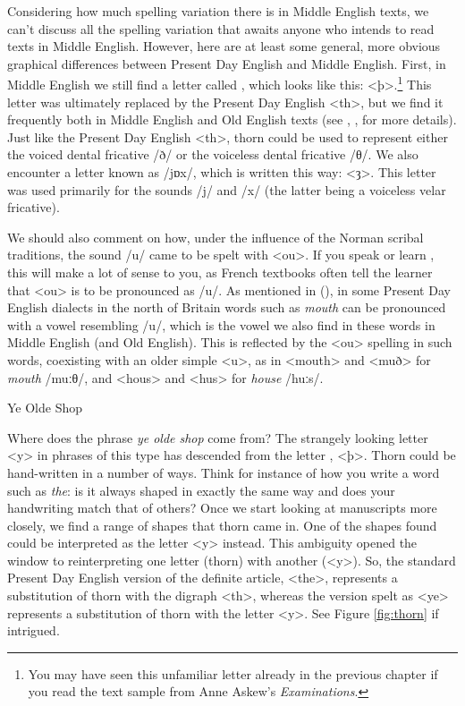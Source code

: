 \noindent Considering how much spelling variation there is in Middle English texts, we can't discuss all the spelling variation that awaits anyone who intends to read texts in Middle English. However, here are at least some general, more obvious graphical differences between Present Day English and Middle English. First, in Middle English we still find a letter called , which looks like this: <þ>.\footnote{You may have seen this unfamiliar letter already in the previous chapter if you read the text sample from Anne Askew's \textit{Examinations}.} This letter was ultimately replaced by the Present Day English <th>, but we find it frequently both in Middle English and Old English texts (see , , for more details). Just like the Present Day English <th>, thorn could be used to represent either the voiced dental fricative /ð/ or the voiceless dental fricative /θ/. We also encounter a letter known as  /jɒx/, which is written this way: <ȝ>. This letter was used primarily for the sounds /j/ and /x/ (the latter being a voiceless velar fricative).

We should also comment on how, under the influence of the Norman scribal traditions, the sound /u/ came to be spelt with <ou>. If you speak or learn , this will make a lot of sense to you, as French textbooks often tell the learner that <ou> is to be pronounced as /u/. As mentioned in  (), in some Present Day English dialects in the north of Britain words such as \textit{mouth} can be pronounced with a vowel resembling /u/, which is the vowel we also find in these words in Middle English (and Old English). This is reflected by the <ou> spelling in such words, coexisting with an older simple <u>, as in <mouth> and <muð> for \textit{mouth} /muːθ/, and <hous> and <hus> for \textit{house} /huːs/.


\begin{sourcebox}{Ye Olde Shop}

Where does the phrase \textit{ye olde shop} come from? The strangely looking letter <y> in phrases of this type has descended from the letter , <þ>. Thorn could be hand-written in a number of ways. Think for instance of how you write a word such as \textit{the}: is it always shaped in exactly the same way and does your handwriting match that of others? Once we start looking at manuscripts more closely, we find a range of shapes that thorn came in. One of the shapes found could be interpreted as the letter <y> instead. This ambiguity opened the window to reinterpreting one letter (thorn) with another (<y>). So, the standard Present Day English version of the definite article, <the>, represents a substitution of thorn with the digraph <th>, whereas the version spelt as <ye> represents a substitution of thorn with the letter <y>. See Figure \ref{fig:thorn} if intrigued.
\end{sourcebox}


